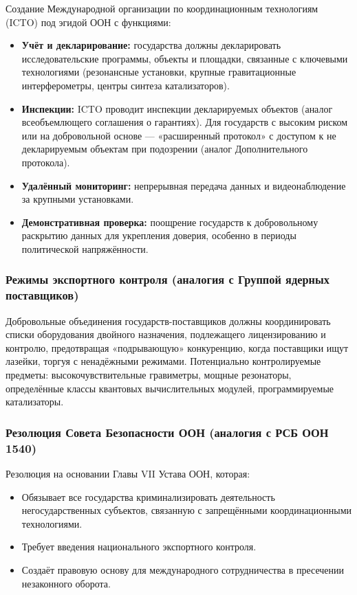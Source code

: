 \documentclass[12pt,a4paper]{article}
\theoremstyle{remark}
\begin{document}
	Создание Международной организации по координационным технологиям (ICTO) под эгидой ООН с функциями:
	\begin{itemize}
		\item \textbf{Учёт и декларирование:} государства должны декларировать исследовательские программы, объекты и площадки, связанные с ключевыми технологиями (резонансные установки, крупные гравитационные интерферометры, центры синтеза катализаторов).
		\item \textbf{Инспекции:} ICTO проводит инспекции декларируемых объектов (аналог всеобъемлющего соглашения о гарантиях). Для государств с высоким риском или на добровольной основе — «расширенный протокол» с доступом к не декларируемым объектам при подозрении (аналог Дополнительного протокола).
		\item \textbf{Удалённый мониторинг:} непрерывная передача данных и видеонаблюдение за крупными установками.
		\item \textbf{Демонстративная проверка:} поощрение государств к добровольному раскрытию данных для укрепления доверия, особенно в периоды политической напряжённости.
	\end{itemize}
	
	\subsubsection{Режимы экспортного контроля (аналогия с Группой ядерных поставщиков)}
	
	Добровольные объединения государств-поставщиков должны координировать списки оборудования двойного назначения, подлежащего лицензированию и контролю, предотвращая «подрывающую» конкуренцию, когда поставщики ищут лазейки, торгуя с ненадёжными режимами. Потенциально контролируемые предметы: высокочувствительные гравиметры, мощные резонаторы, определённые классы квантовых вычислительных модулей, программируемые катализаторы.
	
	\subsubsection{Резолюция Совета Безопасности ООН (аналогия с РСБ ООН 1540)}
	
	Резолюция на основании Главы VII Устава ООН, которая:
	\begin{itemize}
		\item Обязывает все государства криминализировать деятельность негосударственных субъектов, связанную с запрещёнными координационными технологиями.
		\item Требует введения национального экспортного контроля.
		\item Создаёт правовую основу для международного сотрудничества в пресечении незаконного оборота.
	\end{itemize}
	
\end{document}
